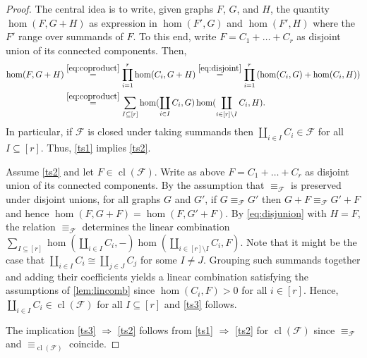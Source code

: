 \documentclass[3p,final]{elsarticle}
\DeclareMathOperator{\cl}{cl}
\begin{document}
	\begin{proof}
		The central idea is to write, given graphs $F$, $G$, and $H$, the quantity $\hom(F, G + H)$ as expression in $\hom(F', G)$ and $\hom(F', H)$ where the $F'$ range over summands of $F$.
		To this end, write $F = C_1 + \dots + C_r$ as disjoint union of its connected components. Then,
		\begin{align}
			\hom(F, G + H) 
			&\overset{\eqref{eq:coproduct}}{=} \prod_{i=1}^r \hom(C_i, G + H) \notag
			\overset{\eqref{eq:disjoint}}{=} \prod_{i=1}^r \left( \hom(C_i, G) + \hom(C_i, H) \right) \notag \\
			&\overset{\eqref{eq:coproduct}}{=} \sum_{I \subseteq [r]} \hom(\coprod_{i \in I} C_i, G) \hom(\coprod_{i \in [r] \setminus I} C_i, H). \label{eq:disjunion}
		\end{align}
		In particular, if $\mathcal{F}$ is closed under taking summands 
		then $\coprod_{i \in I} C_i \in \mathcal{F}$ for all $I \subseteq [r]$.
		Thus, \ref{ts1} implies \ref{ts2}.
		
		Assume \ref{ts2} and let $F \in \cl(\mathcal{F})$. Write as above $F = C_1 + \dots + C_r$ as disjoint union of its connected components.
		By the assumption that $\equiv_{\mathcal{F}}$ is preserved under disjoint unions, for all graphs $G$ and $G'$, if $G \equiv_{\mathcal{F}} G'$ then $G + F \equiv_{\mathcal{F}} G' + F$ and hence $\hom(F, G+F) = \hom(F, G' + F)$.
		By \cref{eq:disjunion} with $H = F$, 
		the relation $\equiv_{\mathcal{F}}$ determines the linear combination $\sum_{I \subseteq [r]} \hom(\coprod_{i \in I} C_i, -) \hom(\coprod_{i \in [r] \setminus I} C_i, F)$. 
		Note that it might be the case that $\coprod_{i \in I} C_i \cong \coprod_{j \in J} C_j$ for some $I \neq J$.
		Grouping such summands together and adding their coefficients yields a linear combination satisfying the assumptions of \cref{lem:lincomb} since $\hom(C_i, F) > 0$ for all $i \in [r]$. Hence, $\coprod_{i \in I} C_i \in \cl(\mathcal{F})$ for all $I \subseteq [r]$ and \ref{ts3} follows.
		
		
		The implication \ref{ts3} $\Rightarrow$ \ref{ts2} follows from \ref{ts1} $\Rightarrow$ \ref{ts2} for $\cl(\mathcal{F})$ since $\equiv_{\mathcal{F}}$ and $\equiv_{\cl(\mathcal{F})}$ coincide.
	\end{proof}
\end{document}
